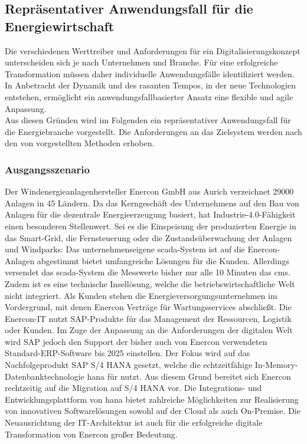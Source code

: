 \subsection{Repräsentativer Anwendungsfall für die Energiewirtschaft}\label{usecase}

Die verschiedenen Werttreiber und Anforderungen für ein Digitalisierungskonzept unterscheiden sich je nach Unternehmen und Branche.
Für eine erfolgreiche Transformation müssen daher individuelle Anwendungsfälle identifiziert werden.
In Anbetracht der Dynamik und des rasanten Tempos, in der neue Technologien entstehen,
ermöglicht ein anwendungsfallbasierter Ansatz eine flexible und agile Anpassung. \citep[S. 31]{Acharya2019}
\\Aus diesen Gründen wird im Folgenden ein repräsentativer Anwendungsfall für die Energiebranche vorgestellt. Die Anforderungen an das Zielsystem werden nach den von \citet{Lauenroth2016} vorgestellten Methoden erhoben.

\subsubsection{Ausgangsszenario} \label{usecase}

Der Windenergieanlagenhersteller Enercon GmbH aus Aurich verzeichnet 29000 Anlagen in 45 Ländern. Da das Kerngeschäft des Unternehmens auf den Bau von Anlagen für die dezentrale Energieerzeugung basiert, hat Industrie-4.0-Fähigkeit einen besonderen Stellenwert. Sei es die Einspeisung der produzierten Energie in das Smart-Grid, die Fernsteuerung oder die Zustandsüberwachung der Anlagen und Windparks: Das unternehmenseigene \acf{scada}-System ist auf die Enercon-Anlagen abgestimmt bietet umfangreiche Lösungen für die Kunden. Allerdings versendet das \ac{scada}-System die Messwerte bisher nur alle 10 Minuten das \ac{cms}. Zudem ist es eine technische Insellösung, welche die betriebswirtschaftliche Welt nicht integriert. Als Kunden stehen die Energieversorgungsunternehmen im Vordergrund, mit denen Enercon Verträge für Wartungsservices abschließt. Die Enercon-IT nutzt SAP-Produkte für das Management der Ressourcen, Logistik oder Kunden. Im Zuge der Anpassung an die Anforderungen der digitalen Welt wird SAP jedoch den Support der bisher auch von Enercon verwendeten Standard-ERP-Software bis 2025 einstellen. Der Fokus wird auf das Nachfolgeprodukt SAP S/4 HANA gesetzt, welche die echtzeitfähige In-Memory-Datenbanktechnologie \acf{hana} für nutzt. Aus diesem Grund bereitet sich Enercon rechtzeitig auf die Migration auf S/4 HANA vor. Die Integrations- und Entwicklungsplattform von \ac{hana} bietet zahlreiche Möglichkeiten zur Realisierung von innovativen Softwarelösungen sowohl auf der Cloud als auch On-Premise. Die Neuausrichtung der IT-Architektur ist auch für die erfolgreiche digitale Transformation von Enercon großer Bedeutung.

